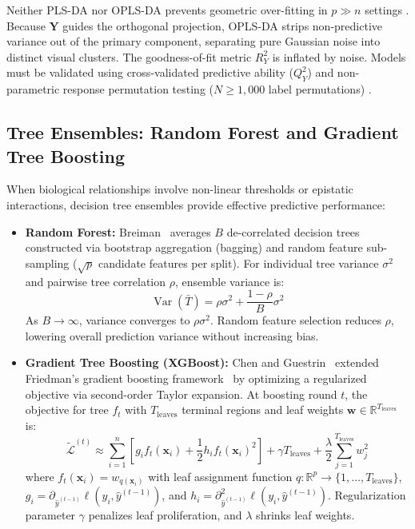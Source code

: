\documentclass[11pt,oneside]{book}
\begin{document}
Neither PLS-DA nor OPLS-DA prevents geometric over-fitting in $p \gg n$ settings \cite{broadhurst2006statistical, westerhuis2008assessment}. Because $\mathbf{Y}$ guides the orthogonal projection, OPLS-DA strips non-predictive variance out of the primary component, separating pure Gaussian noise into distinct visual clusters. The goodness-of-fit metric $R^2_Y$ is inflated by noise. Models must be validated using cross-validated predictive ability ($Q^2_Y$) and non-parametric response permutation testing ($N \ge 1{,}000$ label permutations) \cite{westerhuis2008assessment}.

\subsection{Tree Ensembles: Random Forest and Gradient Tree Boosting}

When biological relationships involve non-linear thresholds or epistatic interactions, decision tree ensembles provide effective predictive performance:
\begin{itemize}
    \item \textbf{Random Forest:} Breiman~\cite{breiman2001random} averages $B$ de-correlated decision trees constructed via bootstrap aggregation (bagging) and random feature sub-sampling ($\sqrt{p}$ candidate features per split). For individual tree variance $\sigma^2$ and pairwise tree correlation $\rho$, ensemble variance is:
    \begin{equation}
    \operatorname{Var}(\bar{T}) = \rho \sigma^2 + \frac{1 - \rho}{B}\sigma^2
    \end{equation}
    As $B \to \infty$, variance converges to $\rho \sigma^2$. Random feature selection reduces $\rho$, lowering overall prediction variance without increasing bias.
    \item \textbf{Gradient Tree Boosting (XGBoost):} Chen and Guestrin~\cite{chen2016xgboost} extended Friedman's gradient boosting framework~\cite{friedman2001greedy} by optimizing a regularized objective via second-order Taylor expansion. At boosting round $t$, the objective for tree $f_t$ with $T_{\text{leaves}}$ terminal regions and leaf weights $\mathbf{w} \in \mathbb{R}^{T_{\text{leaves}}}$ is:
    \begin{equation}
    \tilde{\mathcal{L}}^{(t)} \approx \sum_{i=1}^n \left[ g_i f_t(\mathbf{x}_i) + \frac{1}{2} h_i f_t(\mathbf{x}_i)^2 \right] + \gamma T_{\text{leaves}} + \frac{\lambda}{2} \sum_{j=1}^{T_{\text{leaves}}} w_j^2
    \end{equation}
    where $f_t(\mathbf{x}_i) = w_{q(\mathbf{x}_i)}$ with leaf assignment function $q: \mathbb{R}^p \to \{1, \dots, T_{\text{leaves}}\}$, $g_i = \partial_{\hat{y}^{(t-1)}} \ell(y_i, \hat{y}^{(t-1)})$, and $h_i = \partial^2_{\hat{y}^{(t-1)}} \ell(y_i, \hat{y}^{(t-1)})$. Regularization parameter $\gamma$ penalizes leaf proliferation, and $\lambda$ shrinks leaf weights.
\end{itemize}
\end{document}
